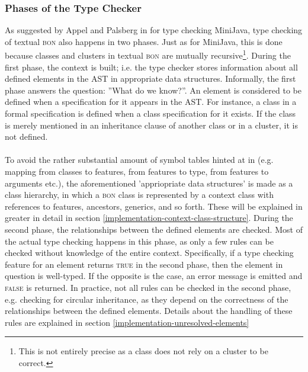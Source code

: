 \subsubsection	{Phases of the Type Checker}
\label{design-phases}
As suggested by Appel and Palsberg in \cite[section~5.2]{appel2004} for type checking MiniJava, type checking of textual \textsc{bon} also happens in two phases. Just as for MiniJava, this is done because classes and clusters in textual \textsc{bon} are mutually recursive\footnote{This is not entirely precise as a class does not rely on a cluster to be correct.}.
During the first phase, the context is built; i.e. the type checker stores information about all defined elements in the AST in appropriate data structures. Informally, the first phase answers the question: ''What do we know?''. An element is considered to be defined when a specification for it appears in the AST. For instance, a class in a formal specification is defined when a class specification for it exists. If the class is merely mentioned in an inheritance clause of another class or in a cluster, it is not defined.
\paragraph{} To avoid the rather substantial amount of symbol tables hinted at in \cite{appel2004} (e.g. mapping from classes to features, from features to type, from features to arguments etc.), the aforementioned 'appriopriate data structures' is made as a class hierarchy, in which a \textsc{bon} class is represented by a context class with references to features, ancestors, generics, and so forth. These will be explained in greater in detail in section \ref{implementation-context-class-structure}.
During the second phase, the relationships between the defined elements are checked. Most of the actual type checking happens in this phase, as only a few rules can be checked without knowledge of the entire context. Specifically, if a type checking feature for an element returns \textsc{true} in the second phase, then the element in question is well-typed. If the opposite is the case, an error message is emitted and \textsc{false} is returned. In practice, not all rules can be checked in the second phase, e.g. checking for circular inheritance, as they depend on the correctness of the relationships between the defined elements. Details about the handling of these rules are explained in section \ref{implementation-unresolved-elements}

